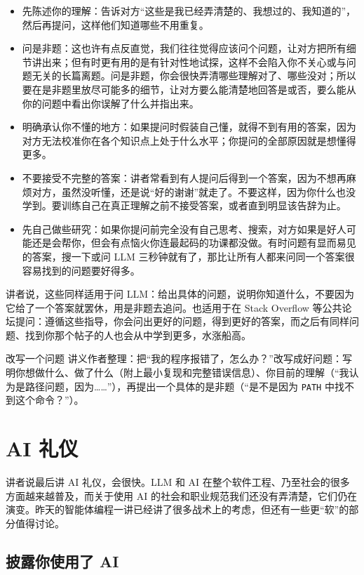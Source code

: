 \documentclass[a4paper]{article}
\begin{document}
\begin{itemize}
\item 先陈述你的理解：告诉对方“这些是我已经弄清楚的、我想过的、我知道的”，然后再提问，这样他们知道哪些不用重复。
\item 问是非题：这也许有点反直觉，我们往往觉得应该问个问题，让对方把所有细节讲出来；但有时更有用的是有针对性地试探，这样不会陷入你不关心或与问题无关的长篇离题。问是非题，你会很快弄清哪些理解对了、哪些没对；所以要在是非题里放尽可能多的细节，让对方要么能清楚地回答是或否，要么能从你的问题中看出你误解了什么并指出来。
\item 明确承认你不懂的地方：如果提问时假装自己懂，就得不到有用的答案，因为对方无法校准你在各个知识点上处于什么水平；你提问的全部原因就是想懂得更多。
\item 不要接受不完整的答案：讲者常看到有人提问后得到一个答案，因为不想再麻烦对方，虽然没听懂，还是说“好的谢谢”就走了。不要这样，因为你什么也没学到。要训练自己在真正理解之前不接受答案，或者直到明显该告辞为止。
\item 先自己做些研究：如果你提问前完全没有自己思考、搜索，对方如果是好人可能还是会帮你，但会有点恼火你连最起码的功课都没做。有时问题有显而易见的答案，搜一下或问 LLM 三秒钟就有了，那比让所有人都来问同一个答案很容易找到的问题要好得多。
\end{itemize}

讲者说，这些同样适用于问 LLM：给出具体的问题，说明你知道什么，不要因为它给了一个答案就罢休，用是非题去追问。也适用于在 Stack Overflow 等公共论坛提问：遵循这些指导，你会问出更好的问题，得到更好的答案，而之后有同样问题、找到你那个帖子的人也会从中学到更多，水涨船高。

\begin{practicebox}{改写一个问题}
讲义作者整理：把“我的程序报错了，怎么办？”改写成好问题：写明你想做什么、做了什么（附上最小复现和完整错误信息）、你目前的理解（“我认为是路径问题，因为……”），再提出一个具体的是非题（“是不是因为 \texttt{PATH} 中找不到这个命令？”）。
\end{practicebox}

\section{AI 礼仪}

讲者说最后讲 AI 礼仪，会很快。LLM 和 AI 在整个软件工程、乃至社会的很多方面越来越普及，而关于使用 AI 的社会和职业规范我们还没有弄清楚，它们仍在演变。昨天的智能体编程一讲已经讲了很多战术上的考虑，但还有一些更“软”的部分值得讨论。

\subsection{披露你使用了 AI}
\end{document}
